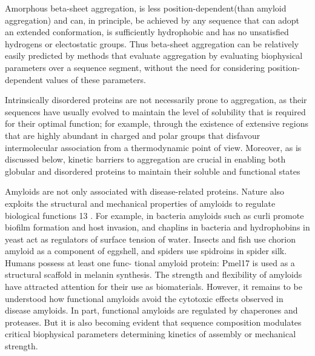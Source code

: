 
Amorphous beta-sheet aggregation, is less position-dependent(than amyloid aggregation) and can, in principle, be achieved by any sequence that can adopt an extended conformation, is sufficiently hydrophobic and has no unsatisfied hydrogens or electostatic groups. 
Thus beta-sheet aggregation can be relatively easily predicted by methods that evaluate aggregation by evaluating biophysical parameters over a sequence segment, without the need for considering position-dependent values of these parameters.







Intrinsically disordered proteins are not necessarily prone to aggregation, as their sequences have usually evolved to maintain the level
of solubility that is required for their optimal function; for example, through the existence of extensive regions that are highly abundant in charged and polar groups
that disfavour intermolecular association from a thermodynamic point of view. 
Moreover, as is discussed below, kinetic barriers to aggregation are crucial in enabling both globular and disordered proteins to maintain their soluble and functional states





Amyloids are not only associated with disease-related proteins.
Nature also exploits the structural and mechanical properties
of amyloids to regulate biological functions 13 . For example, in
bacteria amyloids such as curli promote biofilm formation and
host invasion, and chaplins in bacteria and hydrophobins in yeast
act as regulators of surface tension of water. Insects and fish
use chorion amyloid as a component of eggshell, and spiders
use spidroins in spider silk. Humans possess at least one func-
tional amyloid protein: Pmel17 is used as a structural scaffold
in melanin synthesis. The strength and flexibility of amyloids
have attracted attention for their use as biomaterials. However,
it remains to be understood how functional amyloids avoid the
cytotoxic effects observed in disease amyloids. In part, functional
amyloids are regulated by chaperones and proteases. But it is
also becoming evident that sequence composition modulates
critical biophysical parameters determining kinetics of assembly
or mechanical strength.




